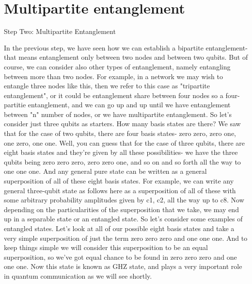 \section{Multipartite entanglement}

Step Two: Multipartite Entanglement

In the previous step, we have seen how we can establish a bipartite entanglement- that means entanglement only between two nodes and between two qubits. But of course, we can consider also other types of entanglement, namely entangling between more than two nodes. For example, in a network we may wish to entangle three nodes like this, then we refer to this case as "tripartite entanglement", or it could be entanglement share between four nodes so a four-partitie entanglement, and we can go up and up until we have entanglement between "n" number of nodes, or we have multipartite entanglement. So let's consider just three qubits as starters. How many basis states are there? We saw that for the case of two qubits, there are four basis states- zero zero, zero one, one zero, one one. Well, you can guess that for the case of three qubits, there are eight basis states and they're given by all these possibilities- we have the three qubits being zero zero zero, zero zero one, and so on and so forth all the way to one one one. And any general pure state can be written as a general superposition of all of these eight basis states. For example, we can write any general three-qubit state as follows here as a superposition of all of these with some arbitrary probability amplitudes given by c1, c2, all the way up to c8. Now depending on the particularities of the superposition that we take, we may end up in a separable state or an entangled state. So let's consider some examples of entangled states. Let's look at all of our possible eight basis states and take a very simple superposition of just the term zero zero zero and one one one. And to keep things simple we will consider this superposition to be an equal superposition, so we've got equal chance to be found in zero zero zero and one one one. Now this state is known as GHZ state, and plays a very important role in quantum communication as we will see shortly.

